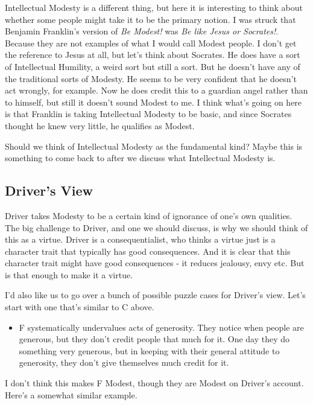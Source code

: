 \documentclass[
]{article}
\providecommand{\tightlist}{%
  \setlength{\itemsep}{0pt}\setlength{\parskip}{0pt}}
\begin{document}
Intellectual Modesty is a different thing, but here it is interesting to
think about whether some people might take it to be the primary notion.
I was struck that Benjamin Franklin's version of \emph{Be Modest!} was
\emph{Be like Jesus or Socrates!}. Because they are not examples of what
I would call Modest people. I don't get the reference to Jesus at all,
but let's think about Socrates. He does have a sort of Intellectual
Humility, a weird sort but still a sort. But he doesn't have any of the
traditional sorts of Modesty. He seems to be very confident that he
doesn't act wrongly, for example. Now he does credit this to a guardian
angel rather than to himself, but still it doesn't sound Modest to me. I
think what's going on here is that Franklin is taking Intellectual
Modesty to be basic, and since Socrates thought he knew very little, he
qualifies as Modest.

Should we think of Intellectual Modesty as the fundamental kind? Maybe
this is something to come back to after we discuss what Intellectual
Modesty is.

\hypertarget{drivers-view}{%
\subsection{Driver's View}\label{drivers-view}}

Driver takes Modesty to be a certain kind of ignorance of one's own
qualities. The big challenge to Driver, and one we should discuss, is
why we should think of this as a virtue. Driver is a consequentialist,
who thinks a virtue just is a character trait that typically has good
consequences. And it is clear that this character trait might have good
consequences - it reduces jealousy, envy etc. But is that enough to make
it a virtue.

I'd also like us to go over a bunch of possible puzzle cases for
Driver's view. Let's start with one that's similar to C above.

\begin{itemize}
\tightlist
\item
  F systematically undervalues acts of generosity. They notice when
  people are generous, but they don't credit people that much for it.
  One day they do something very generous, but in keeping with their
  general attitude to generosity, they don't give themselves much credit
  for it.
\end{itemize}

I don't think this makes F Modest, though they are Modest on Driver's
account. Here's a somewhat similar example.
\end{document}
